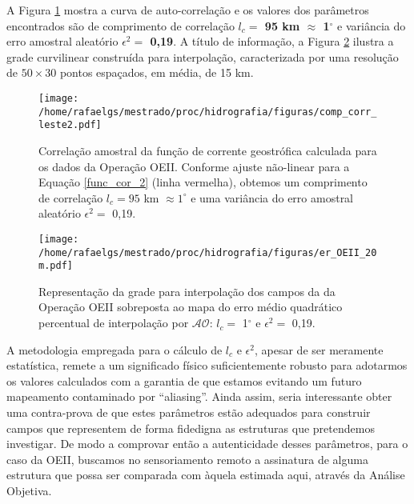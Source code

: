 \documentclass[12pt,portuguese,a4paper,pdftex]{article}
\renewcommand{\baselinestretch}{1.5}
\begin{document}
A Figura \ref{fig:corr_oeii} mostra a curva de 
auto-correlação e os valores dos parâmetros encontrados são de comprimento de 
correlação \textbf{$l_c =$ 95 km $\approx$ 1$^\circ$} e variância do erro amostral 
aleatório \textbf{$\epsilon^2 =$ 0,19}. A título de informação, a Figura \ref{fig:grades_oeii}
 ilustra a grade curvilinear construída para 
interpolação, caracterizada por uma resolução de $50 \times 30$ pontos espaçados, em média, 
de 15 km.


\begin{figure}%
 \begin{center}
  \texttt{[image: /home/rafaelgs/mestrado/proc/hidrografia/figuras/comp\_corr\_leste2.pdf]}
 \end{center}
 \vspace{-.25cm}
 \renewcommand{\baselinestretch}{1}
 \caption{\label{fig:corr_oeii} \small Correlação amostral da função de corrente 
 geostrófica calculada para os dados da Operação OEII. Conforme ajuste não-linear para a Equação 
 \ref{func_cor_2} (linha vermelha), obtemos um comprimento de correlação $l_c = 95$ km 
 $\approx 1^\circ$ e uma variância do erro amostral aleatório $\epsilon^2 =$ 0,19.}
\end{figure}

\begin{figure}%
 \begin{center}
  \texttt{[image: /home/rafaelgs/mestrado/proc/hidrografia/figuras/er\_OEII\_20m.pdf]}
 \end{center}
 \vspace{-.25cm}
 \renewcommand{\baselinestretch}{1}
 \caption{\label{fig:grades_oeii} \small Representação da grade para interpolação dos campos da 
 da Operação OEII sobreposta ao mapa do erro médio quadrático percentual de interpolação por 
 $\mathcal{AO}$: $l_c =$ 1$^\circ$ e $\epsilon^{2} =$ 0,19.}
\end{figure}

A metodologia empregada para o cálculo de $l_c$ e $\epsilon^2$, apesar de ser meramente estatística, 
remete a um significado físico suficientemente robusto para adotarmos os valores calculados com a garantia
de que estamos evitando um futuro mapeamento contaminado por ``aliasing''. Ainda assim, seria interessante
obter uma contra-prova de que estes parâmetros estão adequados para construir campos que representem de forma
fidedigna as estruturas que pretendemos investigar. De modo a comprovar então a autenticidade desses parâmetros, 
para o caso da OEII, buscamos no sensoriamento remoto a assinatura de alguma estrutura que possa ser comparada 
com àquela estimada aqui, através da Análise Objetiva. 
\end{document}
